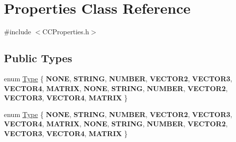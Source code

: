 \hypertarget{classProperties}{}\section{Properties Class Reference}
\label{classProperties}


{\ttfamily \#include $<$C\+C\+Properties.\+h$>$}

\subsection*{Public Types}
\begin{DoxyCompactItemize}
\item 
enum \hyperlink{classProperties_a2d14cc7f8d9f987905632969cc4070e9}{Type} \{ \newline
{\bfseries N\+O\+NE}, 
{\bfseries S\+T\+R\+I\+NG}, 
{\bfseries N\+U\+M\+B\+ER}, 
{\bfseries V\+E\+C\+T\+O\+R2}, 
\newline
{\bfseries V\+E\+C\+T\+O\+R3}, 
{\bfseries V\+E\+C\+T\+O\+R4}, 
{\bfseries M\+A\+T\+R\+IX}, 
{\bfseries N\+O\+NE}, 
\newline
{\bfseries S\+T\+R\+I\+NG}, 
{\bfseries N\+U\+M\+B\+ER}, 
{\bfseries V\+E\+C\+T\+O\+R2}, 
{\bfseries V\+E\+C\+T\+O\+R3}, 
\newline
{\bfseries V\+E\+C\+T\+O\+R4}, 
{\bfseries M\+A\+T\+R\+IX}
 \}
\item 
enum \hyperlink{classProperties_a2d14cc7f8d9f987905632969cc4070e9}{Type} \{ \newline
{\bfseries N\+O\+NE}, 
{\bfseries S\+T\+R\+I\+NG}, 
{\bfseries N\+U\+M\+B\+ER}, 
{\bfseries V\+E\+C\+T\+O\+R2}, 
\newline
{\bfseries V\+E\+C\+T\+O\+R3}, 
{\bfseries V\+E\+C\+T\+O\+R4}, 
{\bfseries M\+A\+T\+R\+IX}, 
{\bfseries N\+O\+NE}, 
\newline
{\bfseries S\+T\+R\+I\+NG}, 
{\bfseries N\+U\+M\+B\+ER}, 
{\bfseries V\+E\+C\+T\+O\+R2}, 
{\bfseries V\+E\+C\+T\+O\+R3}, 
\newline
{\bfseries V\+E\+C\+T\+O\+R4}, 
{\bfseries M\+A\+T\+R\+IX}
 \}
\end{DoxyCompactItemize}
